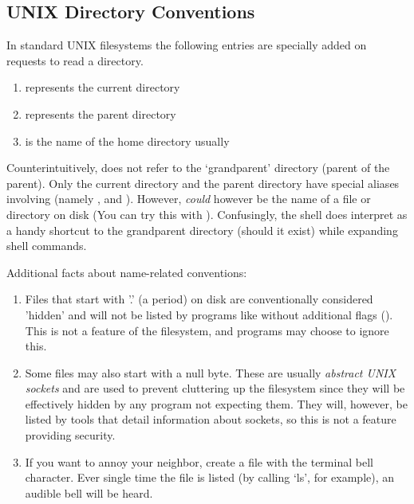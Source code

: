 \subsection{UNIX Directory Conventions}

In standard UNIX filesystems the following entries are specially added on requests to read a directory.

\begin{enumerate}
  \item {} represents the current directory
  \item {} represents the parent directory
  \item \keyword{\textasciitilde} is the name of the home directory usually
\end{enumerate}

Counterintuitively,  does not refer to the `grandparent' directory (parent of the parent).
Only the current directory and the parent directory have special aliases involving  (namely ,  and ).
However,  \emph{could} however be the name of a file or directory on disk (You can try this with ).
Confusingly, the shell  does interpret  as a handy shortcut to the grandparent directory (should it exist) while expanding shell commands.

Additional facts about name-related conventions:

\begin{enumerate}
    \item Files that start with '.' (a period) on disk are conventionally considered 'hidden' and will not be listed by programs like  without additional flags ().
        This is not a feature of the filesystem, and programs may choose to ignore this.
    \item Some files may also start with a null byte.
            These are usually \emph{abstract UNIX sockets} and are used to prevent cluttering up the filesystem since they will be effectively hidden by any program not expecting them.
            They will, however, be listed by tools that detail information about sockets, so this is not a feature providing security.
    \item If you want to annoy your neighbor, create a file with the terminal bell character.
        Ever single time the file is listed (by calling `ls', for example), an audible bell will be heard.
\end{enumerate}


